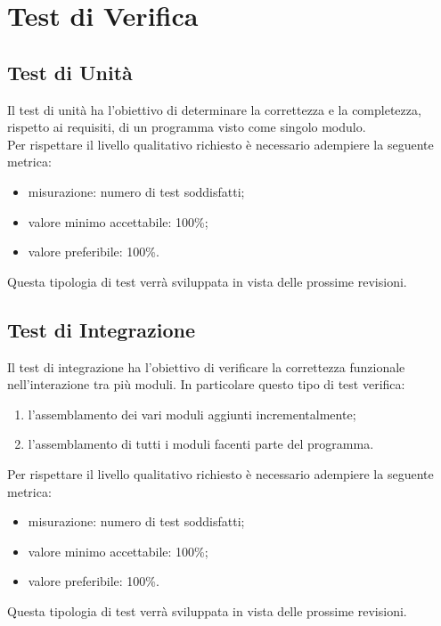 \section{Test di Verifica}

\subsection{Test di Unità}
Il test di unità ha l'obiettivo di determinare la correttezza e la completezza, rispetto ai requisiti, di un programma visto come singolo modulo.\\
Per rispettare il livello qualitativo richiesto è necessario adempiere la seguente metrica:
\begin{itemize}
	\item{misurazione: numero di test soddisfatti;}
	\item{valore minimo accettabile: 100\%;}
	\item{valore preferibile: 100\%.}
\end{itemize}
Questa tipologia di test verrà sviluppata in vista delle prossime revisioni.


\subsection{Test di Integrazione}
Il test di integrazione ha l'obiettivo di verificare la correttezza funzionale nell’interazione tra più moduli. In particolare questo tipo di test verifica:
\begin{enumerate}
	\item{l'assemblamento dei vari moduli aggiunti incrementalmente;}
	\item{l'assemblamento di tutti i moduli facenti parte del programma.}
\end{enumerate}
Per rispettare il livello qualitativo richiesto è necessario adempiere la seguente metrica:
\begin{itemize}
	\item{misurazione: numero di test soddisfatti;}
	\item{valore minimo accettabile: 100\%;}
	\item{valore preferibile: 100\%.}
\end{itemize}
Questa tipologia di test verrà sviluppata in vista delle prossime revisioni.


